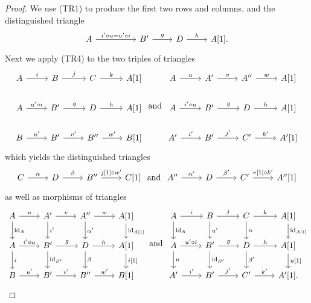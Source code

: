 \documentclass[dissertation.tex]{subfiles}
\begin{document}
\begin{prop}
  \begin{proof}
    We use (TR1) to produce the first two rows and columns, and the distinguished triangle 
    $$\begin{tikzcd}
      A \arrow{rr}{i^\prime \circ u = u^\prime \circ i} & & B^\prime \arrow{r}{g} & D \arrow{r}{h} & A[1].
    \end{tikzcd}$$
    Next we apply (TR4) to the two triples of triangles
    $$\begin{tikzcd}
      A \arrow{r}{i}& B\arrow{r}{j} & C\arrow{r}{k} & A[1]\\
      A \arrow{r}{u^\prime \circ i}& B^\prime \arrow{r}{g} & D \arrow{r}{h} & A[1]\\
      B \arrow{r}{u^\prime} & B^\prime \arrow{r}{v^\prime} & B^{\prime\prime} \arrow{r}{w^\prime}& B[1]
    \end{tikzcd}
    \ \text{and}\ 
    \begin{tikzcd}
      A \arrow{r}{u} & A^\prime \arrow{r}{v} & A^{\prime\prime}\arrow{r}{w} & A[1]\\
      A\arrow{r}{i^\prime \circ u} & B^\prime \arrow{r}{g} & D \arrow{r}{h} & A[1]\\
      A^\prime \arrow{r}{i^\prime} & B^\prime \arrow{r}{j^\prime} & C^\prime \arrow{r}{k^\prime} & A^\prime[1]
    \end{tikzcd}$$
    which yields the distinguished triangles
    $$\begin{tikzcd}
      C \arrow{r}{\alpha} & D \arrow{r}{\beta} & B^{\prime\prime} \arrow{r}{j[1] \circ w^\prime} & C[1]
    \end{tikzcd}
    \ \text{and}\ 
    \begin{tikzcd}
      A^{\prime\prime} \arrow{r}{\alpha^\prime} & D \arrow{r}{\beta^\prime} & C^\prime \arrow{r}{v[1] \circ k^\prime} & A^{\prime\prime}[1]
    \end{tikzcd}$$
    as well as morphisms of triangles
    $$\begin{tikzcd}
      A \arrow{r}{u}\arrow{d}{\id_A} & A^\prime \arrow{r}{v}\arrow{d}{i^\prime} & A^{\prime\prime} \arrow{r}{w}\arrow{d}{\alpha^\prime} & A[1] \arrow{d}{\id_{A[1]}}\\
      A \arrow{r}{i^\prime \circ u} \arrow{d}{i} & B^\prime \arrow{r}{g}\arrow{d}{\id_{B^\prime}} & D \arrow{r}{h}\arrow{d}{\beta} & A[1]\arrow{d}{i[1]}\\
      B \arrow{r}{u^\prime} & B^\prime \arrow{r}{v^\prime} & B^{\prime\prime} \arrow{r}{w^\prime} & B[1]
    \end{tikzcd}
    \ \text{and}\ 
    \begin{tikzcd}
      A \arrow{r}{i} \arrow{d}{\id_A} & B \arrow{r}{j}\arrow{d}{u^\prime} & C \arrow{r}{k}\arrow{d}{\alpha} & A[1]\arrow{d}{\id_{A[1]}}\\
      A \arrow{r}{u^\prime \circ i}\arrow{d}{u} & B^\prime \arrow{r}{g}\arrow{d}{\id_{B^\prime}} & D \arrow{r}{h}\arrow{d}{\beta^\prime} & A[1]\arrow{d}{u[1]}\\
      A^\prime \arrow{r}{i^\prime} & B^\prime \arrow{r}{j^\prime} & C^\prime \arrow{r}{k^\prime} & A^\prime[1].
    \end{tikzcd}$$


\end{proof}
\end{prop}
\end{document}
